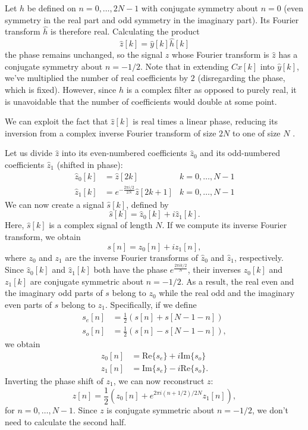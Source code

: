 \documentclass[twocolumn]{article}
\begin{document}
Let $h$ be defined on $n=0,\ldots,2N-1$ with conjugate symmetry about $n=0$ (even symmetry in the real part and odd symmetry in the imaginary part). Its Fourier transform $\hat{h}$ is therefore real. Calculating the product
\[
\hat{z}[k] = \hat{y}[k]\hat{h}[k]
\]
the phase remains unchanged, so the signal $z$ whose Fourier transform is $\hat{z}$ has a conjugate symmetry about $n=-1/2$. Note that in extending $Cx[k]$ into $\hat{y}[k]$, we've multiplied the number of real coefficients by $2$ (disregarding the phase, which is fixed). However, since $h$ is a complex filter as opposed to purely real, it is unavoidable that the number of coefficients would double at some point.

We can exploit the fact that $\hat{z}[k]$ is real times a linear phase, reducing its inversion from a complex inverse Fourier transform of size $2N$ to one of size $N$ \cite{brigham}.

Let us divide $\hat{z}$ into its even-numbered coefficients $\hat{z}_0$ and its odd-numbered coefficients $\hat{z}_1$ (shifted in phase):
\begin{align*}
\hat{z}_0[k] &= \hat{z}[2k] & k=0,\ldots,N-1 \\
\hat{z}_1[k] &= e^{-\frac{2\pi i/2}{2N}}\hat{z}[2k+1] & k=0,\ldots,N-1
\end{align*}
We can now create a signal $\hat{s}[k]$, defined by
\[
\hat{s}[k] = \hat{z}_0[k]+i\hat{z}_1[k].
\]
Here, $\hat{s}[k]$ is a complex signal of length $N$. If we compute its inverse Fourier transform, we obtain
\[
s[n] = z_0[n]+iz_1[n],
\]
where $z_0$ and $z_1$ are the inverse Fourier transforms of $\hat{z}_0$ and $\hat{z}_1$, respectively. Since $\hat{z}_0[k]$ and $\hat{z}_1[k]$ both have the phase $e^{\frac{2\pi i k/2}{N}}$, their inverses $z_0[k]$ and $z_1[k]$ are conjugate symmetric about $n=-1/2$. As a result, the real even and the imaginary odd parts of $s$ belong to $z_0$ while the real odd and the imaginary even parts of $s$ belong to $z_1$. Specifically, if we define
\begin{align*}
s_e[n] &= \frac{1}{2}\left(s[n]+s[N-1-n]\right) \\
s_o[n] &= \frac{1}{2}\left(s[n]-s[N-1-n]\right),
\end{align*}
we obtain
\begin{align*}
z_0[n] &= \mathrm{Re}\{s_e\}+i\mathrm{Im}\{s_o\} \\
z_1[n] &= \mathrm{Im}\{s_e\}-i\mathrm{Re}\{s_o\}.
\end{align*}
Inverting the phase shift of $z_1$, we can now reconstruct $z$:
\[
z[n] = \frac{1}{2}\left(z_0[n]+e^{2\pi i (n+1/2)/2N}z_1[n]\right),
\]
for $n=0,\ldots,N-1$. Since $z$ is conjugate symmetric about $n=-1/2$, we don't need to calculate the second half.
\end{document}

